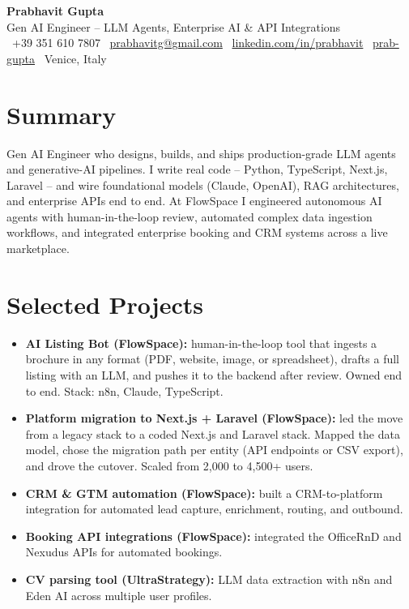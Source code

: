 \documentclass[a4paper,10pt]{article}
\begin{document}
\begin{center}
 {\Huge\bfseries Prabhavit Gupta}\\[3pt]
 {\color{accent}\large Gen AI Engineer -- LLM Agents, Enterprise AI \& API Integrations}\\[5pt]
 \faPhone\ +39 351 610 7807 \quad
 \faEnvelope\ \href{mailto:prabhavitg@gmail.com}{prabhavitg@gmail.com} \quad
 \faLinkedin\ \href{https://www.linkedin.com/in/prabhavit/}{linkedin.com/in/prabhavit} \quad
 \faGithub\ \href{https://github.com/prab-gupta}{prab-gupta} \quad
 \faMapMarker*\ Venice, Italy
\end{center}

\section{Summary}
Gen AI Engineer who designs, builds, and ships production-grade LLM agents and generative-AI pipelines. I write real code -- Python, TypeScript, Next.js, Laravel -- and wire foundational models (Claude, OpenAI), RAG architectures, and enterprise APIs end to end. At FlowSpace I engineered autonomous AI agents with human-in-the-loop review, automated complex data ingestion workflows, and integrated enterprise booking and CRM systems across a live marketplace.

\section{Selected Projects}
\begin{itemize}
 \item \textbf{AI Listing Bot (FlowSpace):} human-in-the-loop tool that ingests a brochure in any format (PDF, website, image, or spreadsheet), drafts a full listing with an LLM, and pushes it to the backend after review. Owned end to end. Stack: n8n, Claude, TypeScript.
 \item \textbf{Platform migration to Next.js + Laravel (FlowSpace):} led the move from a legacy stack to a coded Next.js and Laravel stack. Mapped the data model, chose the migration path per entity (API endpoints or CSV export), and drove the cutover. Scaled from 2,000 to 4,500+ users.
 \item \textbf{CRM \& GTM automation (FlowSpace):} built a CRM-to-platform integration for automated lead capture, enrichment, routing, and outbound.
 \item \textbf{Booking API integrations (FlowSpace):} integrated the OfficeRnD and Nexudus APIs for automated bookings.
 \item \textbf{CV parsing tool (UltraStrategy):} LLM data extraction with n8n and Eden AI across multiple user profiles.
\end{itemize}
\end{document}
